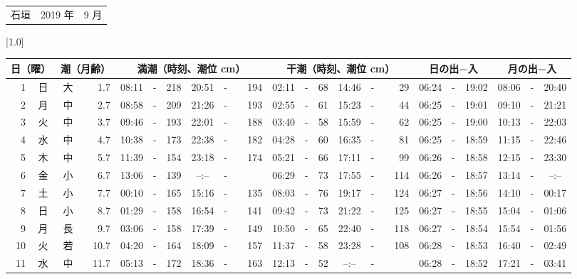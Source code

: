 \documentclass[12pt,a4j]{jsarticle}
\begin{document}
 \begin{table}[htbp]
 \begin{center}
 \begin{tabular}{lcc}
 \LARGE{石垣}  & \large{2019 年} & \large{ 9 月} \\
 \end{tabular}
 \end{center}
 \begin{center}
    \scalebox{0.7}[1.0]{
    \begin{tabular}{|rc|cr|ccrccr|ccrccr|ccc|ccc|}
    \hline
    \multicolumn{2}{|c|}{日（曜）} & \multicolumn{2}{c|}{潮（月齢）} & \multicolumn{6}{c|}{満潮（時刻、潮位 cm）} & \multicolumn{6}{c|}{干潮（時刻、潮位 cm）} & \multicolumn{3}{c|}{日の出−入} &  \multicolumn{3}{c|}{月の出−入}\\
 \hline
 1 & 日 & 大 &  1.7 &  08:11 &-& 218 &  20:51 &-& 194 &  02:11 &-&  68 &  14:46 &-&  29 & 06:24 & -& 19:02 & 08:06 & -& 20:40 \\
 2 & 月 & 中 &  2.7 &  08:58 &-& 209 &  21:26 &-& 193 &  02:55 &-&  61 &  15:23 &-&  44 & 06:25 & -& 19:01 & 09:10 & -& 21:21 \\
 3 & 火 & 中 &  3.7 &  09:46 &-& 193 &  22:01 &-& 188 &  03:40 &-&  58 &  15:59 &-&  62 & 06:25 & -& 19:00 & 10:13 & -& 22:03 \\
 4 & 水 & 中 &  4.7 &  10:38 &-& 173 &  22:38 &-& 182 &  04:28 &-&  60 &  16:35 &-&  81 & 06:25 & -& 18:59 & 11:15 & -& 22:46 \\
 5 & 木 & 中 &  5.7 &  11:39 &-& 154 &  23:18 &-& 174 &  05:21 &-&  66 &  17:11 &-&  99 & 06:26 & -& 18:58 & 12:15 & -& 23:30 \\
 6 & 金 & 小 &  6.7 &  13:06 &-& 139 &  --:-- &-&~~~~~ &  06:29 &-&  73 &  17:55 &-& 114 & 06:26 & -& 18:57 & 13:14 & -& --:-- \\
 7 & 土 & 小 &  7.7 &  00:10 &-& 165 &  15:16 &-& 135 &  08:03 &-&  76 &  19:17 &-& 124 & 06:27 & -& 18:56 & 14:10 & -& 00:17 \\
 8 & 日 & 小 &  8.7 &  01:29 &-& 158 &  16:54 &-& 141 &  09:42 &-&  73 &  21:22 &-& 125 & 06:27 & -& 18:55 & 15:04 & -& 01:06 \\
 9 & 月 & 長 &  9.7 &  03:06 &-& 158 &  17:39 &-& 149 &  10:50 &-&  65 &  22:40 &-& 118 & 06:27 & -& 18:54 & 15:54 & -& 01:56 \\
10 & 火 & 若 & 10.7 &  04:20 &-& 164 &  18:09 &-& 157 &  11:37 &-&  58 &  23:28 &-& 108 & 06:28 & -& 18:53 & 16:40 & -& 02:49 \\
11 & 水 & 中 & 11.7 &  05:13 &-& 172 &  18:36 &-& 163 &  12:13 &-&  52 &  --:-- &-&~~~~~ & 06:28 & -& 18:52 & 17:21 & -& 03:41 \\

\end{tabular}}
\end{center}
\end{table}
\end{document}
